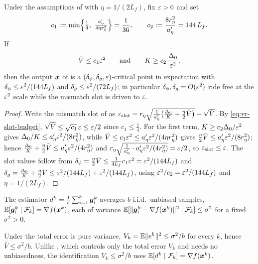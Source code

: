 \begin{corollary}
\label{cor:vr-slot-reduction}
Under the assumptions of  with $\eta=1/(2L_f)$, fix
$\varepsilon>0$ and set
\[
    c_1:=\min\Bigl\{\tfrac14,\ \tfrac{a'_\eta}{4\eta r_\eta^2}\Bigr\}=\frac1{36},
    \qquad
    c_2:=\frac{8r_\eta^2}{a'_\eta}=144\,L_f .
\]
If
\begin{equation}
    \bar V\le c_1\varepsilon^2
    \qquad\text{and}\qquad
    K\ge c_2\,\frac{\Delta_0}{\varepsilon^2},
    \label{eq:vr-slot-budget}
\end{equation}
then the output $\bar{\bm{x}}$ of  is a
$(\delta_\phi,\delta_g,\varepsilon)$-critical point in expectation with
$\delta_\phi\le \varepsilon^2/(144L_f)$ and $\delta_g\le \varepsilon^2/(72L_f)$; in particular
$\delta_\phi,\delta_g=O(\varepsilon^2)$ ride free at the $\varepsilon^2$ scale while the
mismatch slot is driven to $\varepsilon$.
\end{corollary}

\begin{proof}
Write the mismatch slot of  as
$\varepsilon_{\mathrm{slot}}
 =r_\eta\sqrt{\tfrac1{a'_\eta}\bigl(\tfrac{\Delta_0}K+\tfrac\eta2\bar V\bigr)}
 +\sqrt{\bar V}$.
By \eqref{eq:vr-slot-budget}, $\sqrt{\bar V}\le\sqrt{c_1}\,\varepsilon\le\varepsilon/2$ since
$c_1\le\tfrac14$. For the first term, $K\ge c_2\Delta_0/\varepsilon^2$ gives
$\Delta_0/K\le a'_\eta\varepsilon^2/(8r_\eta^2)$, while
$\bar V\le c_1\varepsilon^2\le a'_\eta\varepsilon^2/(4\eta r_\eta^2)$ gives
$\tfrac\eta2\bar V\le a'_\eta\varepsilon^2/(8r_\eta^2)$; hence
$\tfrac{\Delta_0}K+\tfrac\eta2\bar V\le a'_\eta\varepsilon^2/(4r_\eta^2)$ and
$r_\eta\sqrt{\tfrac1{a'_\eta}\cdot a'_\eta\varepsilon^2/(4r_\eta^2)}=\varepsilon/2$, so
$\varepsilon_{\mathrm{slot}}\le\varepsilon$. The slot values follow from
$\delta_\phi=\tfrac\eta2\bar V\le\tfrac1{4L_f}c_1\varepsilon^2=\varepsilon^2/(144L_f)$ and
$\delta_g=\tfrac{\Delta_0}K+\tfrac\eta2\bar V\le\varepsilon^2/(144L_f)+\varepsilon^2/(144L_f)$,
using $\varepsilon^2/c_2=\varepsilon^2/(144L_f)$ and $\eta=1/(2L_f)$.
\end{proof}

\begin{assumption}
\label{asm:vr-bounded-var}
The estimator $d^k=\tfrac1b\sum_{i=1}^b\bm{g}_i^k$ averages $b$ i.i.d.\ unbiased
samples, $\mathbb{E}[\bm{g}_i^k\mid\mathcal{F}_k]=\nabla f(\bm{x}^k)$, each of variance
$\mathbb{E}[\lVert \bm{g}_i^k-\nabla f(\bm{x}^k)\rVert^2\mid\mathcal{F}_k]\le\sigma^2$ for a fixed
$\sigma^2>0$.
\end{assumption}

Under  the total error is pure variance,
$V_k=\mathbb{E}\lVert e^k\rVert^2\le\sigma^2/b$ for every $k$, hence $\bar V\le\sigma^2/b$.
Unlike , which controls only the total error
$V_k$ and needs no unbiasedness, the identification $V_k\le\sigma^2/b$ uses
$\mathbb{E}[d^k\mid\mathcal{F}_k]=\nabla f(\bm{x}^k)$.

